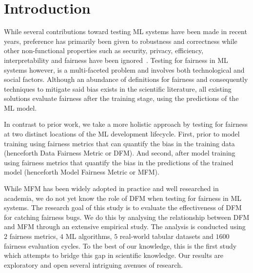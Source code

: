 \documentclass[sigconf,review]{acmart}
\begin{document}
\section{Introduction}\label{sec:intro}

While several contributions toward testing ML systems have been made
in recent years, preference has primarily been given to robustness and
correctness while other non-functional properties such as security,
privacy, efficiency, interpretability and fairness have been
ignored \cite{zhang2020machine,zhang2021ignorance,mehrabi2021survey,wan2021modeling}. Testing
for fairness in ML systems however, is a multi-faceted problem and
involves both technological and social factors. Although an abundance
of definitions for fairness and consequently techniques to mitigate
said bias exists in the scientific literature, all existing solutions
evaluate fairness after the training stage, using the predictions of
the ML model.

In contrast to prior work, we take a more holistic approach by testing
for fairness at two distinct locations of the ML development
lifecycle. First, prior to model training using fairness metrics that
can quantify the bias in the training data (henceforth Data Fairness
Metric or DFM). And second, after model training using fairness
metrics that quantify the bias in the predictions of the trained model
(henceforth Model Fairness Metric or MFM).

While MFM has been widely adopted in practice and well researched in
academia, we do not yet know the role of DFM when testing for fairness
in ML systems. The research goal of this study is to evaluate the
effectiveness of DFM for catching fairness bugs. We do this by
analysing the relationship between DFM and MFM through an extensive
empirical study. The analysis is conducted using $2$ fairness metrics,
$4$ ML algorithms, $5$ real-world tabular datasets and $1600$ fairness
evaluation cycles. To the best of our knowledge, this is the first
study which attempts to bridge this gap in scientific knowledge. Our
results are exploratory and open several intriguing avenues of
research.
\end{document}
